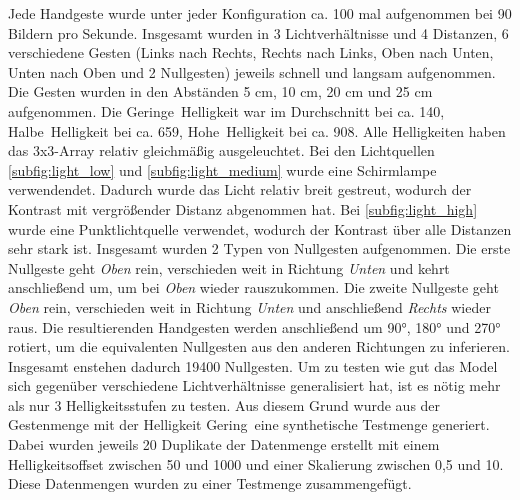 Jede Handgeste wurde unter jeder Konfiguration ca. 100 mal aufgenommen bei 90 Bildern pro Sekunde. Insgesamt wurden in 3 Lichtverhältnisse und 4 Distanzen, 6 verschiedene Gesten (Links nach Rechts,
Rechts nach Links, Oben nach Unten, Unten nach Oben und 2 Nullgesten) jeweils schnell und langsam aufgenommen. Die Gesten wurden in den Abständen 5 cm, 10 cm, 20 cm und 25 cm aufgenommen.
\newline
\newline
Die \glqq Geringe\grqq\ Helligkeit war im Durchschnitt bei ca. 140, \glqq Halbe\grqq\ Helligkeit bei ca. 659, \glqq Hohe\grqq\ Helligkeit bei ca. 908. Alle Helligkeiten haben das 3x3-Array
relativ gleichmäßig ausgeleuchtet. Bei den Lichtquellen \ref{subfig:light_low} und \ref{subfig:light_medium} wurde eine Schirmlampe verwendendet. Dadurch wurde das Licht relativ breit gestreut,
wodurch der Kontrast mit vergrößender Distanz abgenommen hat. Bei \ref{subfig:light_high} wurde eine Punktlichtquelle verwendet, wodurch der Kontrast über alle Distanzen sehr stark ist.
\newline
\newline
Insgesamt wurden 2 Typen von Nullgesten aufgenommen. Die erste Nullgeste geht \textit{Oben} rein, verschieden weit in Richtung \textit{Unten} und kehrt anschließend um, um bei \textit{Oben} wieder rauszukommen.
Die zweite Nullgeste geht \textit{Oben} rein, verschieden weit in Richtung \textit{Unten} und anschließend \textit{Rechts} wieder raus.
\newline
\newline
Die resultierenden Handgesten werden anschließend um 90°, 180° und 270° rotiert, um die equivalenten Nullgesten aus den anderen Richtungen zu inferieren. Insgesamt enstehen dadurch 19400 Nullgesten.
\newline
\newline
Um zu testen wie gut das Model sich gegenüber verschiedene Lichtverhältnisse generalisiert hat, ist es nötig mehr als nur 3 Helligkeitsstufen zu testen. Aus diesem Grund wurde aus der Gestenmenge mit
der Helligkeit \glqq Gering\grqq\ eine synthetische Testmenge generiert.
\newline
\newline
Dabei wurden jeweils 20 Duplikate der Datenmenge erstellt mit einem Helligkeitsoffset zwischen 50 und 1000 und einer Skalierung zwischen 0,5 und 10. Diese Datenmengen wurden zu einer Testmenge zusammengefügt.